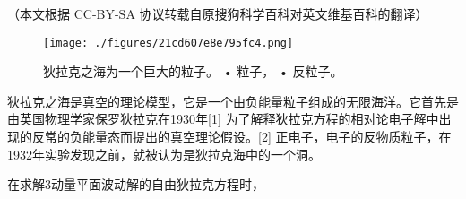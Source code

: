 
（本文根据 CC-BY-SA 协议转载自原搜狗科学百科对英文维基百科的翻译）

\begin{figure}[ht]
\centering
\texttt{[image: ./figures/21cd607e8e795fc4.png]}
\caption{狄拉克之海为一个巨大的粒子。 • 粒子， • 反粒子。} \label{fig_DLKZH_1}
\end{figure}

狄拉克之海是真空的理论模型，它是一个由负能量粒子组成的无限海洋。它首先是由英国物理学家保罗狄拉克在1930年[1] 为了解释狄拉克方程的相对论电子解中出现的反常的负能量态而提出的真空理论假设。[2] 正电子，电子的反物质粒子，在1932年实验发现之前，就被认为是狄拉克海中的一个洞。

在求解3动量平面波动解的自由狄拉克方程时，
